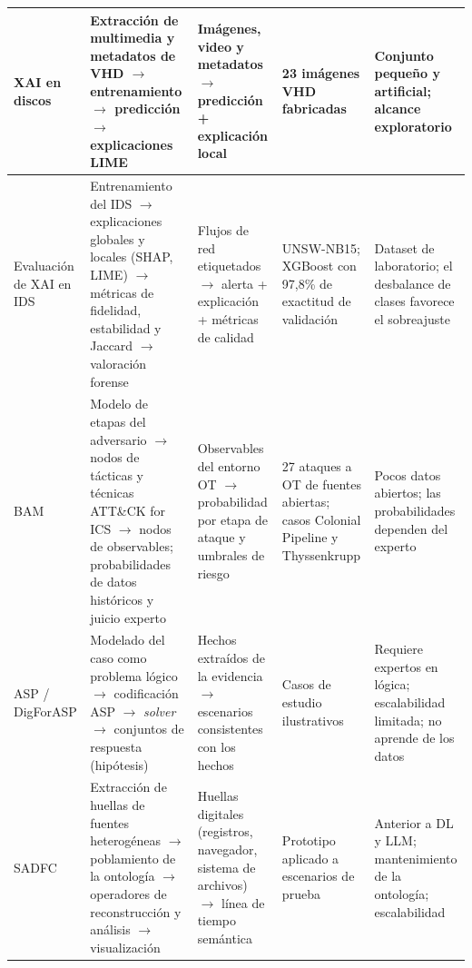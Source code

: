 \documentclass[journal]{IEEEtran}
\begin{document}
\begin{table}[!t]
\begin{tabular}{|L{1.9cm}|L{4.3cm}|L{3.4cm}|L{3.3cm}|L{3.4cm}|}
\hline
XAI en discos & Extracción de multimedia y metadatos de VHD $\rightarrow$ entrenamiento $\rightarrow$ predicción $\rightarrow$ explicaciones LIME & Imágenes, video y metadatos $\rightarrow$ predicción + explicación local & 23 imágenes VHD fabricadas & Conjunto pequeño y artificial; alcance exploratorio \\
\hline
Evaluación de XAI en IDS & Entrenamiento del IDS $\rightarrow$ explicaciones globales y locales (SHAP, LIME) $\rightarrow$ métricas de fidelidad, estabilidad y Jaccard $\rightarrow$ valoración forense & Flujos de red etiquetados $\rightarrow$ alerta + explicación + métricas de calidad & UNSW-NB15; XGBoost con 97,8\% de exactitud de validación & Dataset de laboratorio; el desbalance de clases favorece el sobreajuste \\
\hline
BAM & Modelo de etapas del adversario $\rightarrow$ nodos de tácticas y técnicas ATT\&CK for ICS $\rightarrow$ nodos de observables; probabilidades de datos históricos y juicio experto & Observables del entorno OT $\rightarrow$ probabilidad por etapa de ataque y umbrales de riesgo & 27 ataques a OT de fuentes abiertas; casos Colonial Pipeline y Thyssenkrupp & Pocos datos abiertos; las probabilidades dependen del experto \\
\hline
ASP / DigForASP & Modelado del caso como problema lógico $\rightarrow$ codificación ASP $\rightarrow$ \textit{solver} $\rightarrow$ conjuntos de respuesta (hipótesis) & Hechos extraídos de la evidencia $\rightarrow$ escenarios consistentes con los hechos & Casos de estudio ilustrativos & Requiere expertos en lógica; escalabilidad limitada; no aprende de los datos \\
\hline
SADFC & Extracción de huellas de fuentes heterogéneas $\rightarrow$ poblamiento de la ontología $\rightarrow$ operadores de reconstrucción y análisis $\rightarrow$ visualización & Huellas digitales (registros, navegador, sistema de archivos) $\rightarrow$ línea de tiempo semántica & Prototipo aplicado a escenarios de prueba & Anterior a DL y LLM; mantenimiento de la ontología; escalabilidad \\
\hline
\end{tabular}
\end{table}
\end{document}
